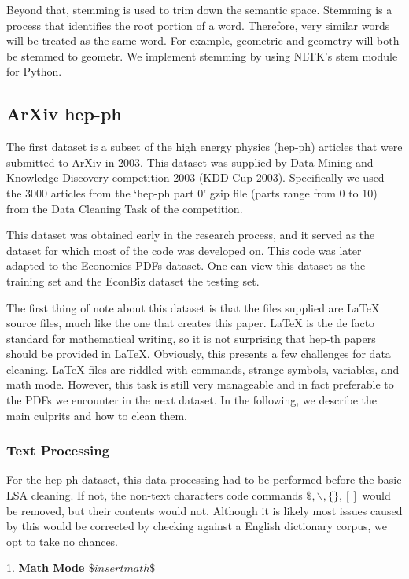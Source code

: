 \documentclass [12pt]{article}
\begin{document}
Beyond that, stemming is used to trim down the semantic space. Stemming is a process that identifies the root portion of a word. Therefore, very similar words will be treated as the same word. For example, geometric and geometry will both be stemmed to geometr. We implement stemming by using NLTK's stem module for Python. 



\subsection{ArXiv hep-ph}
The first dataset is a subset of the high energy physics (hep-ph) articles that were submitted to ArXiv in 2003. This dataset was supplied by Data Mining and Knowledge Discovery competition 2003 (KDD Cup 2003). Specifically we used the 3000 articles from the `hep-ph part 0' gzip file (parts range from 0 to 10) from the Data Cleaning Task of the competition. 

This dataset was obtained early in the research process, and it served as the dataset for which most of the code was developed on. This code was later adapted to the Economics PDFs dataset. One can view this dataset as the training set and the EconBiz dataset the testing set. 

The first thing of note about this dataset is that the files supplied are LaTeX source files, much like the one that creates this paper. LaTeX is the de facto standard for mathematical writing, so it is not surprising that hep-th papers should be provided in LaTeX. Obviously, this presents a few challenges for data cleaning. LaTeX files are riddled with commands, strange symbols, variables, and math mode. However, this task is still very manageable and in fact preferable to the PDFs we encounter in the next dataset. In the following, we describe the main culprits and how to clean them. 


\subsubsection{Text Processing} 

For the hep-ph dataset, this data processing had to be performed before the basic LSA cleaning. If not, the non-text characters code commands $\$, \backslash, \{\}, []$ would be removed, but their contents would not. Although it is likely most issues caused by this would be corrected by checking against a English dictionary corpus, we opt to take no chances. 

1. \textbf{Math Mode $\$ insert math \$$}
\end{document}
